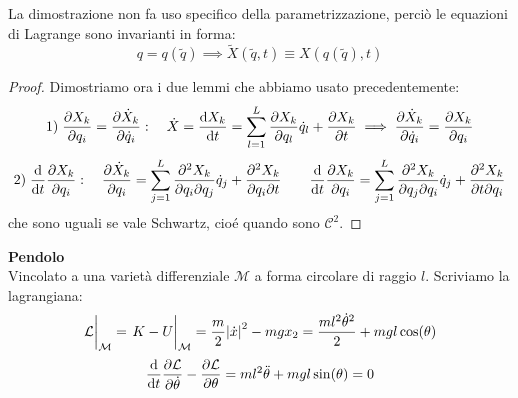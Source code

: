 \begin{remark}
    La dimostrazione non fa uso specifico della parametrizzazione, perciò le equazioni di Lagrange sono invarianti in forma:
    \begin{equation}
        q = q(\tilde{q})\implies \tilde{X}(\tilde{q},t)\equiv X ( q(\tilde{q}),t)
    \end{equation}
\end{remark}
\begin{proof}
    Dimostriamo ora i due lemmi che abbiamo usato precedentemente:
    \begin{equation}
        1)\;\pdv{X_k}{q_i}= \pdv{\dot{X}_k}{\dot{q}_i}: \quad \dot{X}= \dv{X_k}{t}(q(t),t)= \sum_{l=1}^{L}\pdv{X_k}{q_l}\dot{q}_l+ \pdv{X_k}{t}\implies\pdv{\dot{X}_k}{\dot{q}_i}= \pdv{X_k}{q_i}
    \end{equation}
    \begin{equation}
        2)\;\dv{}{t}\pdv{X_k}{q_i}: \quad \pdv{\dot{X}_k}{q_i}= \sum_{j=1}^{L}\pdv{X_k}{q_i}{q_j}\dot{q}_j+\pdv{X_k}{q_i}{t}
        \qquad \dv{}{t}\pdv{X_k}{q_i}= \sum_{j= 1}^{L }\pdv{X_k}{q_j}{q_i}\dot{q}_j +\pdv{X_k}{t}{q_i}
    \end{equation}
    che sono uguali se vale Schwartz, cioé quando sono $\mathcal{C}^2$.
\end{proof}

\begin{example}
    \textbf{Pendolo}\\
    Vincolato a una varietà differenziale $\mathcal{M}$ a forma circolare di raggio $l$. Scriviamo la lagrangiana:
    \begin{equation}
        \eval{\mathcal{L}}_{\mathcal{M}}= \eval{K-U}_{\mathcal{M}}= \frac{m}{2}\abs{\dot{x}}^2-mg x_2= 
        \frac{ml^2\dot{\theta}^2}{2}+ mgl\cos(\theta)
    \end{equation}
    \begin{equation}
        \dv{t}\pdv{\mathcal{L}}{\dot{\theta}}-\pdv{\mathcal{L}}{\theta}= ml^2\ddot{\theta}+mgl\sin(\theta)= 0 
    \end{equation}
\end{example}

